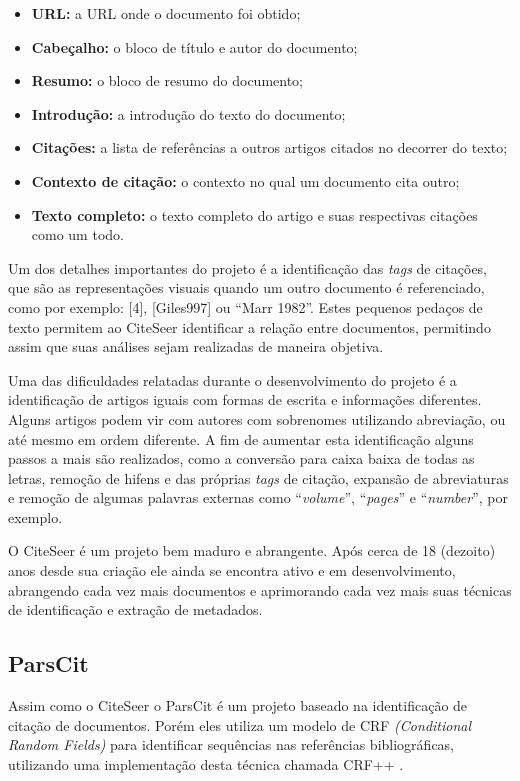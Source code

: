 \begin{itemize}
    \item \textbf{URL:} a URL onde o documento foi obtido;
    \item \textbf{Cabeçalho:} o bloco de título e autor do documento;
    \item \textbf{Resumo:} o bloco de resumo do documento;
    \item \textbf{Introdução:} a introdução do texto do documento;
    \item \textbf{Citações:} a lista de referências a outros artigos citados no decorrer do texto;
    \item \textbf{Contexto de citação:} o contexto no qual um documento cita outro;
    \item \textbf{Texto completo:} o texto completo do artigo e suas respectivas citações como um todo.
\end{itemize}

Um dos detalhes importantes do projeto é a identificação das \textit{tags} de citações, que são as representações visuais quando um outro documento é referenciado, como por exemplo: [4], [Giles997] ou ``Marr 1982''. Estes pequenos pedaços de texto permitem ao CiteSeer identificar a relação entre documentos, permitindo assim que suas análises sejam realizadas de maneira objetiva.

Uma das dificuldades relatadas durante o desenvolvimento do projeto é a identificação de artigos iguais com formas de escrita e informações diferentes. Alguns artigos podem vir com autores com sobrenomes utilizando abreviação, ou até mesmo em ordem diferente. A fim de aumentar esta identificação alguns passos a mais são realizados, como a conversão para caixa baixa de todas as letras, remoção de hifens e das próprias \textit{tags} de citação, expansão de abreviaturas e remoção de algumas palavras externas como ``\textit{volume}'', ``\textit{pages}'' e ``\textit{number}'', por exemplo.

O CiteSeer é um projeto bem maduro e abrangente. Após cerca de 18 (dezoito) anos desde sua criação ele ainda se encontra ativo e em desenvolvimento, abrangendo cada vez mais documentos e aprimorando cada vez mais suas técnicas de identificação e extração de metadados.

\subsection{ParsCit}
\label{ssec:parscit}

Assim como o CiteSeer o ParsCit é um projeto baseado na identificação de citação de documentos. Porém eles utiliza um modelo de CRF \textit{(Conditional Random Fields)} para identificar sequências nas referências bibliográficas, utilizando uma implementação desta técnica chamada CRF++ \cite{Councill-Giles-2008-ParsCit}.

